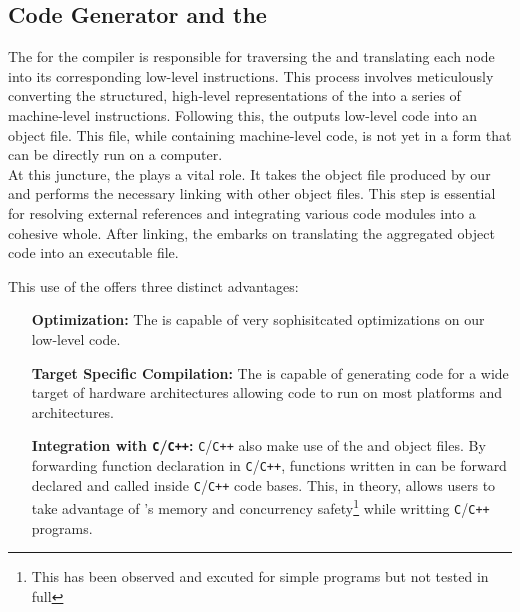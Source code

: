 \subsection{Code Generator and the \gcc{}}
\label{sec:LLVM}

The \codeGen{} for the \lang{} compiler is responsible for traversing the
\ast{} and translating each node into its corresponding low-level
instructions. This process involves meticulously converting the structured,
high-level representations of the \ast{} into a series of machine-level instructions.
Following this, the \codeGen{} outputs low-level code into an object file.
This file, while containing machine-level code, is not yet in a form that can be
directly run on a computer. \\

At this juncture, the \gcc{} plays a vital role. It
takes the object file produced by our \codeGen{} and performs the necessary
linking with other object files. This step is essential for resolving external
references and integrating various code modules into a cohesive whole. After linking,
the \gcc{} embarks on translating the aggregated object code into an executable file. \\

\newpage

This use of the \gcc{} offers three distinct advantages: 

\begin{itemize}
  \item[\textbf{Optimization:}] The \gcc{} is capable of very sophisitcated
    optimizations on our low-level code.
  \item[\textbf{Target Specific Compilation:}] The \gcc{} is capable of generating code
    for a wide target of hardware architectures allowing \lang{} code to run on most
    platforms and architectures.
  \item[\textbf{Integration with \texttt{C}/\texttt{C++}:}] \texttt{C}/\texttt{C++} also make use of the \gcc{} and
    object files. By forwarding function declaration in \texttt{C}/\texttt{C++}, functions written in
    \lang{} can be forward declared and called inside \texttt{C}/\texttt{C++} code
    bases. This, in theory, allows
    users to take advantage of \lang{}'s memory and concurrency
    safety\footnote{This has been observed and excuted for simple programs but
    not tested in full} while writting \texttt{C}/\texttt{C++} programs.
\end{itemize}

